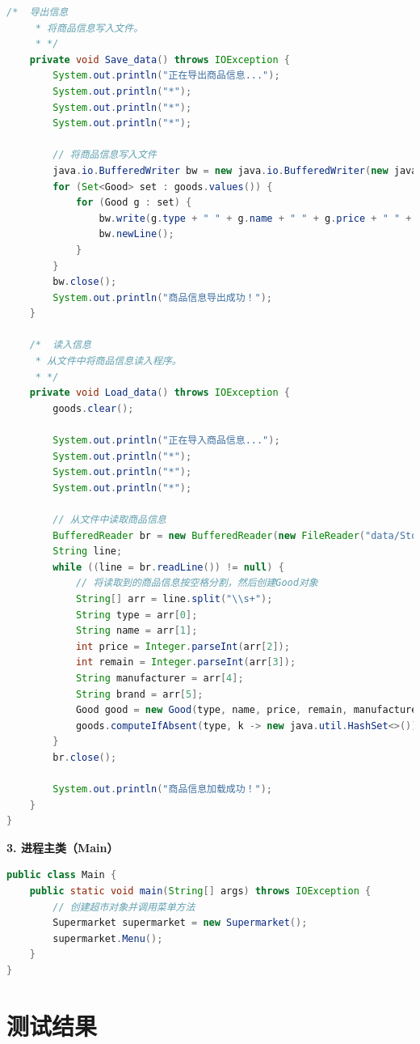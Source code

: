 \documentclass[12pt, a4paper, oneside]{ctexart}
\begin{document}
\begin{lstlisting}[language=Java, breaklines=true]
    /*  导出信息
     * 将商品信息写入文件。
     * */
    private void Save_data() throws IOException {
        System.out.println("正在导出商品信息...");
        System.out.println("*");
        System.out.println("*");
        System.out.println("*");

        // 将商品信息写入文件
        java.io.BufferedWriter bw = new java.io.BufferedWriter(new java.io.FileWriter("data/StoreHouse.txt"));
        for (Set<Good> set : goods.values()) {
            for (Good g : set) {
                bw.write(g.type + " " + g.name + " " + g.price + " " + g.remain + " " + g.manufacturer + " " + g.brand);
                bw.newLine();
            }
        }
        bw.close();
        System.out.println("商品信息导出成功！");
    }

    /*  读入信息
     * 从文件中将商品信息读入程序。
     * */
    private void Load_data() throws IOException {
        goods.clear();

        System.out.println("正在导入商品信息...");
        System.out.println("*");
        System.out.println("*");
        System.out.println("*");

        // 从文件中读取商品信息
        BufferedReader br = new BufferedReader(new FileReader("data/StoreHouse.txt"));
        String line;
        while ((line = br.readLine()) != null) {
            // 将读取到的商品信息按空格分割，然后创建Good对象
            String[] arr = line.split("\\s+");
            String type = arr[0];
            String name = arr[1];
            int price = Integer.parseInt(arr[2]);
            int remain = Integer.parseInt(arr[3]);
            String manufacturer = arr[4];
            String brand = arr[5];
            Good good = new Good(type, name, price, remain, manufacturer, brand);
            goods.computeIfAbsent(type, k -> new java.util.HashSet<>()).add(good);
        }
        br.close();

        System.out.println("商品信息加载成功！");
    }
}
\end{lstlisting}

\textbf{3. 进程主类（Main）}
\begin{lstlisting}[language=Java, breaklines=true]
public class Main {
    public static void main(String[] args) throws IOException {
        // 创建超市对象并调用菜单方法
        Supermarket supermarket = new Supermarket();
        supermarket.Menu();
    }
}
\end{lstlisting}

\section{测试结果}
\end{document}
